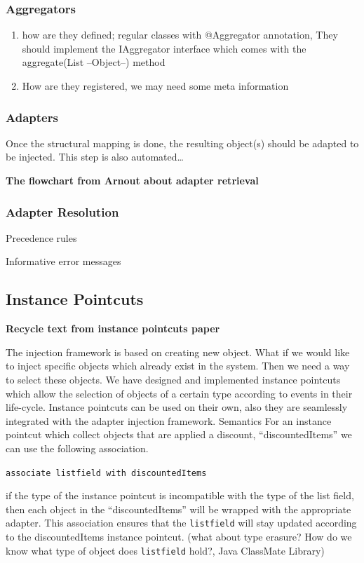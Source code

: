 \documentclass{llncs}
\begin{document}
\subsubsection{Aggregators}
\begin{enumerate}
\item how are they defined; regular classes with @Aggregator annotation, They should implement the IAggregator interface which comes with the aggregate(List --Object--) method
\item How are they registered, we may need some meta information
\end{enumerate}

\subsubsection{Adapters}
Once the structural mapping is done, the resulting object(s) should be adapted to be injected. This step is also automated\ldots

\textbf{The flowchart from Arnout about adapter retrieval}

\subsubsection{Adapter Resolution}
Precedence rules

Informative error messages



\subsection{Instance Pointcuts}
\textbf{Recycle text from instance pointcuts paper}

The injection framework is based on creating new object. What if we would like to inject specific objects which already exist in the system. Then we need a way to select these objects. We have designed and implemented instance pointcuts which allow the selection of objects of a certain type according to events in their life-cycle. Instance pointcuts can be used on their own, also they are seamlessly integrated with the adapter injection framework. 
Semantics
For an instance pointcut which collect objects that are applied a discount, “discountedItems” we can use the following association.

\texttt{associate listfield with discountedItems}


if the type of the instance pointcut is incompatible with the type of the list field, then each object in the “discountedItems” will be wrapped with the appropriate adapter.  This association ensures that the \texttt{listfield} will stay updated according to the discountedItems instance pointcut. (what about type erasure? How do we know what type of object does \texttt{listfield} hold?, Java ClassMate Library)
\end{document}
